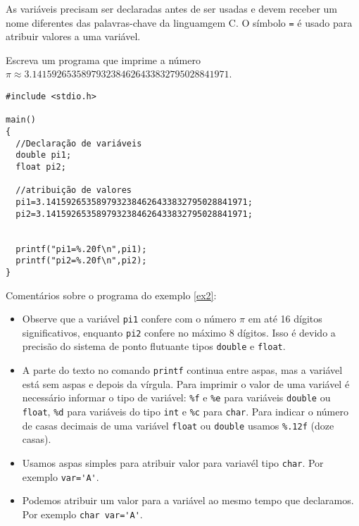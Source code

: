 As variáveis precisam ser declaradas antes de ser usadas e devem receber um nome diferentes das palavras-chave da linguamgem C. O símbolo \verb|=| é usado para atribuir valores a uma variável.
\begin{ex}\label{ex2}Escreva um programa que imprime a número $\pi\approx 3.14159 26535 89793 23846 26433 83279 50288 41971$.
\end{ex}
\begin{verbatim}
#include <stdio.h>

main()
{
  //Declaração de variáveis
  double pi1; 
  float pi2; 

  //atribuição de valores 
  pi1=3.1415926535897932384626433832795028841971; 
  pi2=3.1415926535897932384626433832795028841971; 


  printf("pi1=%.20f\n",pi1); 
  printf("pi2=%.20f\n",pi2); 
}
\end{verbatim}
Comentários sobre o programa do exemplo \ref{ex2}:
\begin{itemize}
 \item Observe que a variável \verb|pi1| confere com o número $\pi$ em até 16 dígitos significativos, enquanto \verb|pi2| confere no máximo 8 dígitos. Isso é devido a precisão do sistema de ponto flutuante tipos \verb|double| e \verb|float|.
 \item A parte do texto no comando \verb|printf| continua entre aspas, mas a variável está sem aspas e depois da vírgula. Para imprimir o valor de uma variável é necessário informar o tipo de variável: \verb|%f| e \verb|%e| para variáveis \verb|double| ou \verb|float|, \verb|%d| para variáveis do tipo \verb|int| e \verb|%c| para \verb|char|. Para indicar o número de casas decimais de uma variável \verb|float| ou \verb|double| usamos \verb|%.12f| (doze casas).
 \item Usamos aspas simples para atribuir valor para variavél tipo \verb|char|. Por exemplo \verb|var='A'|.
 \item Podemos atribuir um valor para a variável ao mesmo tempo que declaramos. Por exemplo \verb|char var='A'|.
 \end{itemize}

 
